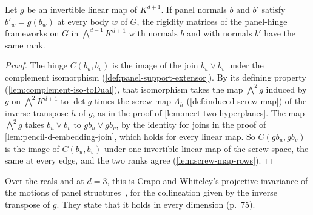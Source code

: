 \begin{lemma}
  \label{lem:pencil-d-rank-collineation}
  \leanok
  Let $g$ be an invertible linear map of $K^{d+1}$. If panel normals $b$
  and $b'$ satisfy $b'_w = g(b_w)$ at every body $w$ of $G$, the
  rigidity matrices of the panel-hinge frameworks on $G$ in
  $\bigwedge^{d-1} K^{d+1}$ with normals $b$ and with normals $b'$ have
  the same rank.
\end{lemma}
\begin{proof}
  \leanok
  The hinge $C(b_u, b_v)$ is the image of the join $b_u \vee b_v$ under
  the complement isomorphism (\cref{def:panel-support-extensor}). By its
  defining property (\cref{lem:complement-iso-toDual}), that isomorphism
  takes the map $\bigwedge^2 g$ induced by $g$ on $\bigwedge^2 K^{d+1}$
  to $\det g$ times the screw map $\Lambda_h$
  (\cref{def:induced-screw-map}) of the inverse transpose $h$ of $g$, as
  in the proof of \cref{lem:meet-two-hyperplanes}. The map
  $\bigwedge^2 g$ takes $b_u \vee b_v$ to $g b_u \vee g b_v$, by the
  identity for joins in the proof of \cref{lem:pencil-d-embedding-join},
  which holds for every linear map. So
  $C(g b_u, g b_v)$ is the
  image of $C(b_u, b_v)$ under one invertible linear map of the screw
  space, the same at every edge, and the two ranks agree
  (\cref{lem:screw-map-rows}).
\end{proof}

Over the reals and at $d = 3$, this is Crapo and Whiteley's projective
invariance of the motions of panel
structures~\cite[\S 3.6]{crapoWhiteley1982}, for the collineation given
by the inverse transpose of $g$. They state that it holds in every
dimension (p.~75).


